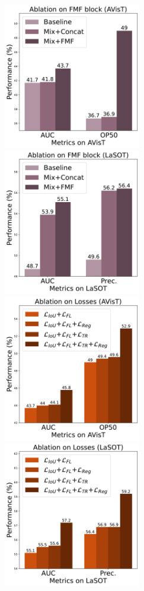   \begin{figure}[t]
	\centering
	 \includegraphics[width=6cm]{figures/abl_fmf_avist.pdf}
	 \includegraphics[width=6cm]{figures/abl_fmf_lasot.pdf}
	 \includegraphics[width=6cm]{figures/abl_losses_avist.pdf}
	 \includegraphics[width=6cm]{figures/abl_losses_lasot.pdf}

\end{figure}
